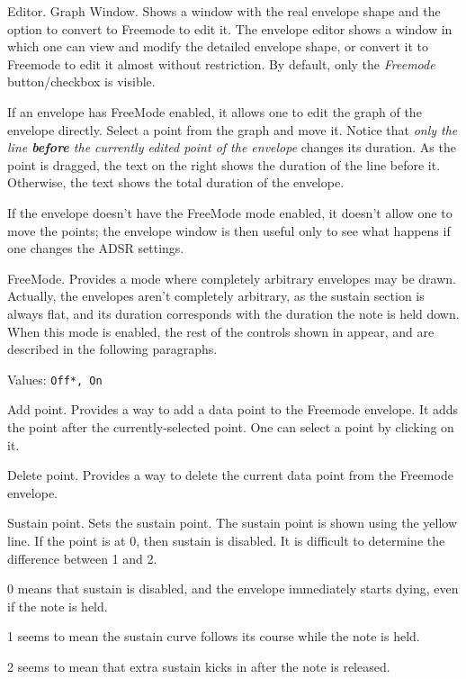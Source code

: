    Editor.  Graph Window.
   Shows a window with the real envelope shape and the option to convert to
   Freemode to edit it.
   The envelope editor shows a window in which one can view and modify the
   detailed envelope shape, or convert it to Freemode to edit it almost
   without restriction.
   By default, only the \textsl{Freemode} button/checkbox is visible.

   If an envelope has FreeMode enabled, it allows one to edit the
   graph of the envelope directly. Select a point from the graph and move it.
   Notice that
   \textsl{only the line \textbf{before} the currently edited point of the
   envelope} changes its duration.
   As the point is dragged, the text on the right shows the duration of
   the line before it. Otherwise, the text shows the total duration of the
   envelope.

   If the envelope doesn't have the FreeMode mode enabled, it doesn't allow
   one to move the points; the envelope window is then useful only to see
   what happens if one changes the ADSR settings.

   FreeMode.  Provides a mode where completely arbitrary envelopes may be
   drawn.
   Actually, the envelopes aren't completely arbitrary, as the sustain
   section is always flat, and its duration corresponds with the duration
   the note is held down.
   When this mode is enabled, the rest of the controls shown in
   appear, and are described in the following paragraphs.

   Values: \texttt{Off*, On}

   Add point.
   Provides a way to add a data point to the Freemode envelope.
   It adds the point after the currently-selected point. One can select a
   point by clicking on it.

   Delete point.
   Provides a way to delete the current data point from the Freemode envelope.

   Sustain point.
   Sets the sustain point.
   The sustain point is shown using the yellow line.
   If the point is at 0, then sustain is disabled.
   It is difficult to determine the difference between 1 and 2.

   \begin{enumber}
      \item{0} means that sustain is disabled, and the envelope immediately
      starts dying, even if the note is held.
      \item{1} seems to mean the sustain curve follows its course while the
      note is held.
      \item{2} seems to mean that extra sustain kicks in after the note is
      released.
   \end{enumber}

